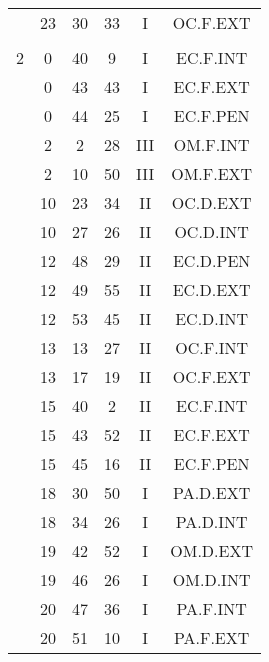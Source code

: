 \documentclass[12pt, a4paper]{article}
\begin{document}
\begin{multicols}{3}
{\begin{tabular}{c c c c c c}
	 	 	 	 & 23 & 30 & 33 & I & OC.F.EXT\\%
	 	 	 	 & & & & & \\%
	 	 	 	2 & 0 & 40 & 9 & I & EC.F.INT\\%
	 	 	 	 & 0 & 43 & 43 & I & EC.F.EXT\\%
	 	 	 	 & 0 & 44 & 25 & I & EC.F.PEN\\%
	 	 	 	 & 2 & 2 & 28 & III & OM.F.INT\\%
	 	 	 	 & 2 & 10 & 50 & III & OM.F.EXT\\%
	 	 	 	 & 10 & 23 & 34 & II & OC.D.EXT\\%
	 	 	 	 & 10 & 27 & 26 & II & OC.D.INT\\%
	 	 	 	 & 12 & 48 & 29 & II & EC.D.PEN\\%
	 	 	 	 & 12 & 49 & 55 & II & EC.D.EXT\\%
	 	 	 	 & 12 & 53 & 45 & II & EC.D.INT\\%
	 	 	 	 & 13 & 13 & 27 & II & OC.F.INT\\%
	 	 	 	 & 13 & 17 & 19 & II & OC.F.EXT\\%
	 	 	 	 & 15 & 40 & 2 & II & EC.F.INT\\%
	 	 	 	 & 15 & 43 & 52 & II & EC.F.EXT\\%
	 	 	 	 & 15 & 45 & 16 & II & EC.F.PEN\\%
	 	 	 	 & 18 & 30 & 50 & I & PA.D.EXT\\%
	 	 	 	 & 18 & 34 & 26 & I & PA.D.INT\\%
	 	 	 	 & 19 & 42 & 52 & I & OM.D.EXT\\%
	 	 	 	 & 19 & 46 & 26 & I & OM.D.INT\\%
	 	 	 	 & 20 & 47 & 36 & I & PA.F.INT\\%
	 	 	 	 & 20 & 51 & 10 & I & PA.F.EXT\\%

\end{tabular}}
\end{multicols}
\end{document}
